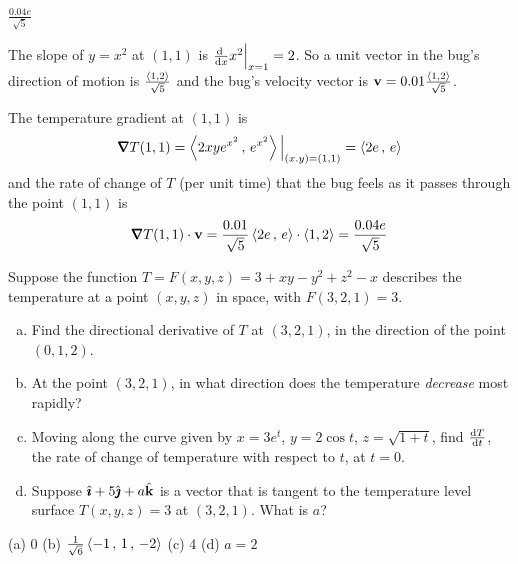 \begin{answer}
$\frac{0.04 e}{\sqrt{5}} $
\end{answer}

\begin{solution}
The slope of $y=x^2$ at $(1,1)$ is $\diff{}{x}x^2\Big|_{x=1}=2$.
So a unit vector in the bug's direction of motion is 
$\frac{\left< 1,2\right>}{\sqrt{5}}$ and the bug's velocity vector is
$\mathbf{v}=0.01\frac{\left< 1,2\right>}{\sqrt{5}}$.

The temperature gradient at $(1,1)$ is
\begin{align*}
\vnabla T(1,1) = \llt 2xy e^{x^2}\,,\,e^{x^2}\rgt\Big|_{(x.y)=(1,1)}
               =\llt 2e\,,\,e\rgt
\end{align*}
and the rate of change of $T$ (per unit time) that the bug feels as it 
passes through the point $(1, 1)$ is
\begin{align*}
\vnabla T(1,1)\cdot \vv
=\frac{0.01}{\sqrt{5}} \llt 2e\,,\,e\rgt\cdot \llt 1,2\rgt
=\frac{0.04 e}{\sqrt{5}} 
\end{align*}
\end{solution}

\begin{question}[M200 2010D] %
Suppose the function $T=F(x,y,z)=3+xy-y^2+z^2-x$ describes the temperature at
a point $(x,y,z)$ in space, with $F(3,2,1)=3$.
\begin{enumerate}[(a)]
\item
Find the directional derivative of $T$ at $(3, 2, 1)$, in the direction of the
point $(0,1,2)$.
\item
At the point $(3, 2, 1)$, in what direction does the temperature
\emph{decrease}  most rapidly?
\item
Moving along the curve given by $x=3e^t$,  $y = 2 \cos t$, $z= \sqrt{1 + t}$, 
find $\diff{T}{t}$, the rate of change of temperature with respect to $t$, at $t = 0$.
\item
Suppose $\hat{\pmb{\imath}}+5\hat{\pmb{\jmath}}+a\hat{\mathbf{k}}$ is a vector that is tangent to the temperature level surface
$T(x, y, z) = 3$ at $(3, 2, 1)$. What is $a$?
\end{enumerate}
\end{question}

%

\begin{answer}
(a) $0$\qquad
(b) $ \frac{1}{\sqrt{6}}\left< -1\,,\,1\,,\,-2 \right> $\qquad
(c) $4$\qquad
(d) $a=2$
\end{answer}

